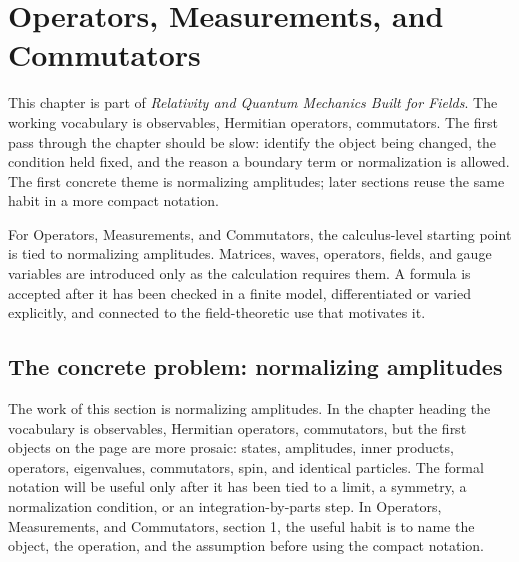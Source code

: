 \chapter{Operators, Measurements, and Commutators}


This chapter is part of \emph{Relativity and Quantum Mechanics Built for Fields}.  The working vocabulary is observables, Hermitian operators, commutators.  The first pass through the chapter should be slow: identify the object being changed, the condition held fixed, and the reason a boundary term or normalization is allowed.  The first concrete theme is normalizing amplitudes; later sections reuse the same habit in a more compact notation.

For Operators, Measurements, and Commutators, the calculus-level starting point is tied to normalizing amplitudes.  Matrices, waves, operators, fields, and gauge variables are introduced only as the calculation requires them.  A formula is accepted after it has been checked in a finite model, differentiated or varied explicitly, and connected to the field-theoretic use that motivates it.

\section{The concrete problem: normalizing amplitudes}













The work of this section is normalizing amplitudes.  In the chapter heading the vocabulary is observables, Hermitian operators, commutators, but the first objects on the page are more prosaic: states, amplitudes, inner products, operators, eigenvalues, commutators, spin, and identical particles.  The formal notation will be useful only after it has been tied to a limit, a symmetry, a normalization condition, or an integration-by-parts step.  In Operators, Measurements, and Commutators, section 1, the useful habit is to name the object, the operation, and the assumption before using the compact notation.

